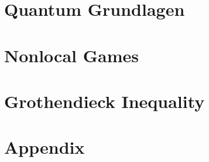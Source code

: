 \newpage
\section{Quantum Grundlagen} %
	\vspace{8pt}
	
%	

\section{Nonlocal Games} %
	\vspace{8pt}

	

\section{Grothendieck Inequality} %
	

\section*{Appendix}
		



	

